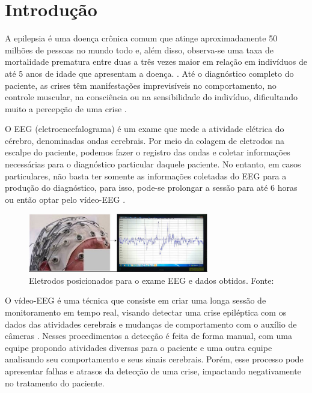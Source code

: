 \chapter{Introdução}\label{chp:intro}

A epilepsia é uma doença crônica comum que atinge aproximadamente 50 milhões de pessoas no mundo todo e, além disso, observa-se uma taxa de mortalidade prematura entre duas a três vezes maior em relação em indivíduos de até 5 anos de idade que apresentam a doença. \cite{EPILEP}. Até o diagnóstico completo do paciente, as crises têm manifestações imprevisíveis no comportamento, no controle muscular, na consciência ou na sensibilidade do indivíduo, dificultando muito a percepção de uma crise \cite{OQ_E}.

O EEG (eletroencefalograma) é um exame que mede a atividade elétrica do cérebro, denominadas ondas cerebrais. Por meio da colagem de eletrodos na escalpe do paciente, podemos fazer o registro das ondas e coletar informações necessárias para o diagnóstico particular daquele paciente. No entanto, em casos particulares, não basta ter somente as informações coletadas do EEG para a produção do diagnóstico, para isso, pode-se prolongar a sessão para até 6 horas ou então optar pelo vídeo-EEG \cite{VIDEOEEG}.

\begin{figure}[H]
    \centering
    \includegraphics[width=0.7\textwidth]{figuras/Exame_EEG.png}
    \caption{Eletrodos posicionados para o exame EEG e dados obtidos. Fonte: \cite{Siddiqui2020}}
    \label{fig:Exame}
\end{figure}

O vídeo-EEG é uma técnica que consiste em criar uma longa sessão de monitoramento em tempo real, visando detectar uma crise epiléptica com os dados das atividades cerebrais e mudanças de comportamento com o auxílio de câmeras \cite{VIDEOEEG}. Nesses procedimentos a detecção é feita de forma manual, com uma equipe propondo atividades diversas para o paciente e uma outra equipe analisando seu comportamento e seus sinais cerebrais. Porém, esse processo pode apresentar falhas e atrasos da detecção de uma crise, impactando negativamente no tratamento do paciente\cite{VIDEOEEG}.

